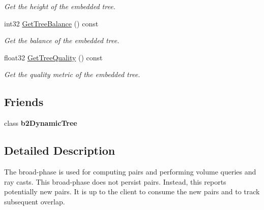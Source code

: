 \begin{DoxyCompactItemize}
\begin{DoxyCompactList}\small\item\em Get the height of the embedded tree. \end{DoxyCompactList}\item 
\hypertarget{classb2_broad_phase_a1189e783d39bfd69b314284ce52ea3c3}{int32 \hyperlink{classb2_broad_phase_a1189e783d39bfd69b314284ce52ea3c3}{Get\-Tree\-Balance} () const }\label{classb2_broad_phase_a1189e783d39bfd69b314284ce52ea3c3}

\begin{DoxyCompactList}\small\item\em Get the balance of the embedded tree. \end{DoxyCompactList}\item 
\hypertarget{classb2_broad_phase_abe02c30ca1b3b9c9b84a571a2f8cef92}{float32 \hyperlink{classb2_broad_phase_abe02c30ca1b3b9c9b84a571a2f8cef92}{Get\-Tree\-Quality} () const }\label{classb2_broad_phase_abe02c30ca1b3b9c9b84a571a2f8cef92}

\begin{DoxyCompactList}\small\item\em Get the quality metric of the embedded tree. \end{DoxyCompactList}\end{DoxyCompactItemize}
\subsection*{Friends}
\begin{DoxyCompactItemize}
\item 
\hypertarget{classb2_broad_phase_afc450dc71ee33ab0c9e7f1c31d6f7f60}{class {\bfseries b2\-Dynamic\-Tree}}\label{classb2_broad_phase_afc450dc71ee33ab0c9e7f1c31d6f7f60}

\end{DoxyCompactItemize}


\subsection{Detailed Description}
The broad-\/phase is used for computing pairs and performing volume queries and ray casts. This broad-\/phase does not persist pairs. Instead, this reports potentially new pairs. It is up to the client to consume the new pairs and to track subsequent overlap. 

